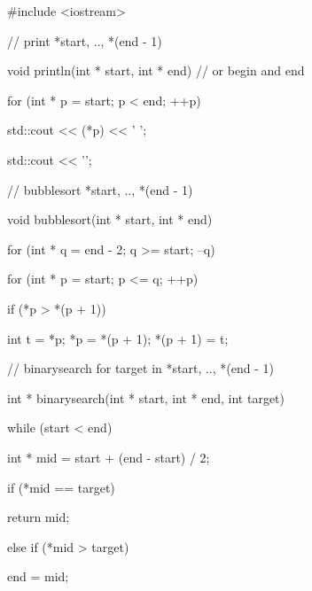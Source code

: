 \begin{consolethree}[escapeinside=||]

#include <iostream>



// print *start, .., *(end - 1)

void println(int * start, int * end) // or begin and end

{

    for (int * p = start; p < end; ++p)

    {

        std::cout << (*p) << ' ';

    }

    std::cout << '\n';

}



// bubblesort *start, .., *(end - 1)

void bubblesort(int * start, int * end)

{

    for (int * q = end - 2; q >= start; --q)

    {

        for (int * p = start; p <= q; ++p)

        {

            if (*p > *(p + 1))

            {

                int t = *p; *p = *(p + 1); *(p + 1) = t;

            }

        }

    }

}



// binarysearch for target in *start, .., *(end - 1)

int * binarysearch(int * start, int * end, int target)

{

    while (start < end)

    {

        int * mid = start + (end - start) / 2;

        if (*mid == target)

        {

            return mid;

        }

        else if (*mid > target)

        {

            end = mid;

}}}
\end{consolethree}
